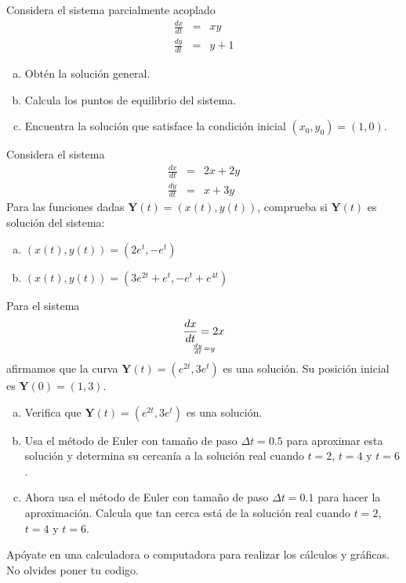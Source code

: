 \documentclass[12pt]{exam}
\begin{document}
\begin{questions}
     \question%
     Considera el sistema parcialmente acoplado $$\begin{array}{rcl}
          \frac{dx}{dt}&=&xy  \\
          \frac{dy}{dt}&=&y+1 
     \end{array}$$
     \begin{enumerate}[a)]
         \item Obtén la solución general.
         \item Calcula los puntos de equilibrio del sistema.
         \item Encuentra la solución que satisface la condición inicial $(x_0,y_0)=(1,0)$.
     \end{enumerate}


     \question%
     Considera el sistema $$\begin{array}{rcl}
          \frac{dx}{dt}&=&2x+2y  \\
          \frac{dy}{dt}&=&x+3y 
     \end{array}$$
     Para las funciones dadas $\mathbf{Y}(t)=(x(t),y(t))$, comprueba si $\mathbf{Y}(t)$ es solución del sistema:
     \begin{enumerate}[a)]
         \item $(x(t),y(t))=(2e^t,-e^t)$
         \item $(x(t),y(t))=(3e^{2t}+e^t,-e^t+e^{4t})$
     \end{enumerate}



     \question%
     Para el sistema $$\frac{dx}{dt}=2x\atop \frac{dy}{dt}=y$$
     afirmamos que la curva $\mathbf{Y}(t)=(e^{2t},3e^t)$ es una solución. Su posición inicial es $\mathbf{Y}(0)=(1,3)$.
     \begin{enumerate}[a)]
         \item Verifica que $\mathbf{Y}(t)=(e^{2t},3e^t)$ es una solución.
         \item Usa el método de Euler con tamaño de paso $\Delta t=0.5$ para aproximar esta solución y determina su cercanía a la solución real cuando $t=2$, $t=4$ y $t=6$.
         \item Ahora usa el método de Euler con tamaño de paso $\Delta t=0.1$ para hacer la aproximación. Calcula que tan cerca está de la solución real cuando $t=2$, $t=4$ y $t=6$.
     \end{enumerate}
     Apóyate en una calculadora o computadora para realizar los cálculos y gráficas. No olvides poner tu codigo.



\end{questions}
\end{document}
